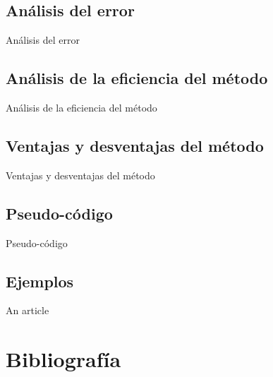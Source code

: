\documentclass[journal,transmag]{IEEEtran}
\theoremstyle{mytheoremstyle}
\theoremstyle{mytheoremstyle}
\theoremstyle{myproblemstyle}
\begin{document}
\subsection{Análisis del error}
\begin{lipsum}
    Análisis del error
\end{lipsum}
\subsection{Análisis de la eficiencia del método}
\begin{lipsum}
    Análisis de la eficiencia del método
\end{lipsum}
\subsection{Ventajas y desventajas del método}
\begin{lipsum}
    Ventajas y desventajas del método
\end{lipsum}
\subsection{Pseudo-código}
\begin{lipsum}
    Pseudo-código
\end{lipsum}
\subsection{Ejemplos}
\begin{lipsum}
    An article \cite{anarticle}
\end{lipsum}
\newpage
\section{Bibliografía}


\end{document}
